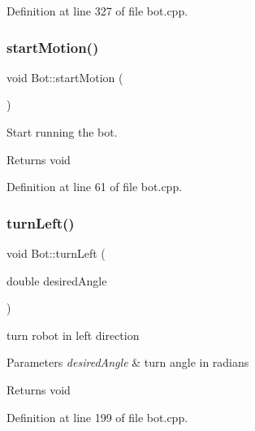 Definition at line 327 of file bot.\+cpp.

\mbox{\label{class_bot_a5c1f98ef7f22894832865c5987d184c3}} 
\subsubsection{\texorpdfstring{start\+Motion()}{startMotion()}}
{\footnotesize\ttfamily void Bot\+::start\+Motion (\begin{DoxyParamCaption}{ }\end{DoxyParamCaption})}



Start running the bot. 

\begin{DoxyReturn}{Returns}
void 
\end{DoxyReturn}


Definition at line 61 of file bot.\+cpp.

\mbox{\label{class_bot_a6f9bf5628c1faedb8da493b381ba95ac}} 
\subsubsection{\texorpdfstring{turn\+Left()}{turnLeft()}}
{\footnotesize\ttfamily void Bot\+::turn\+Left (\begin{DoxyParamCaption}\item[{double}]{desired\+Angle }\end{DoxyParamCaption})}



turn robot in left direction 


\begin{DoxyParams}{Parameters}
{\em desired\+Angle} & turn angle in radians \\
\hline
\end{DoxyParams}
\begin{DoxyReturn}{Returns}
void 
\end{DoxyReturn}


Definition at line 199 of file bot.\+cpp.

\mbox{\label{class_bot_a07fd8d141a617b711eee7ab3c9e99171}} 
